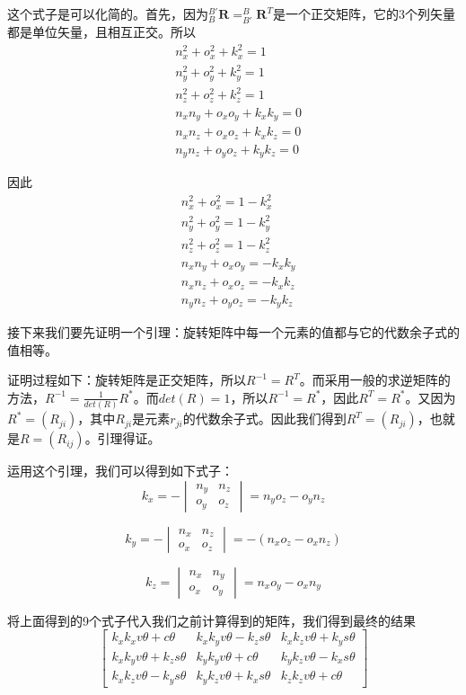 \documentclass{homework}
\begin{document}
\begin{sol}
  这个式子是可以化简的。首先，因为$ _{B}^{B'}\mathbf{R} = _{B'}^{B}\mathbf{R}^T $是一个正交矩阵，它的3个列矢量都是单位矢量，且相互正交。所以
  \begin{align*}
    & n_x^2 + o_x^2 + k_x^2 = 1 \\
    & n_y^2 + o_y^2 + k_y^2 = 1 \\
    & n_z^2 + o_z^2 + k_z^2 = 1 \\
    & n_x n_y + o_x o_y + k_x k_y = 0 \\
    & n_x n_z + o_x o_z + k_x k_z = 0 \\
    & n_y n_z + o_y o_z + k_y k_z = 0 
  \end{align*}

  因此
  \begin{align*}
    & n_x^2 + o_x^2 = 1 - k_x^2 \\
    & n_y^2 + o_y^2 = 1 - k_y^2 \\
    & n_z^2 + o_z^2 = 1 - k_z^2 \\
    & n_x n_y + o_x o_y = -k_x k_y \\
    & n_x n_z + o_x o_z = -k_x k_z \\
    & n_y n_z + o_y o_z = -k_y k_z 
  \end{align*}

  接下来我们要先证明一个引理：旋转矩阵中每一个元素的值都与它的代数余子式的值相等。

  证明过程如下：旋转矩阵是正交矩阵，所以$ R^{-1} = R^T $。而采用一般的求逆矩阵的方法，$ R^{-1} = \frac{1}{det(R)} R^* $。而$ det(R) = 1 $，所以$ R^{-1} = R^* $，因此$ R^T = R^* $。又因为$ R^* = (R_{ji}) $，其中$ R_{ji} $是元素$ r_{ji} $的代数余子式。因此我们得到$ R^T = (R_{ji}) $，也就是$ R = (R_{ij}) $。引理得证。
  
  运用这个引理，我们可以得到如下式子：
  \[
    k_x = -
    \begin{vmatrix}
      n_y & n_z \\
      o_y & o_z 
    \end{vmatrix}
    = n_y o_z - o_y n_z 
  \]
  
  \[
    k_y = -
    \begin{vmatrix}
      n_x & n_z \\
      o_x & o_z 
    \end{vmatrix}
    = -(n_x o_z - o_x n_z)
  \] 

  \[
    k_z = 
    \begin{vmatrix}
      n_x & n_y \\
      o_x & o_y 
    \end{vmatrix}
    = n_x o_y - o_x n_y
  \]

  将上面得到的9个式子代入我们之前计算得到的矩阵，我们得到最终的结果
  \[ 
    \begin{bmatrix}
      k_x k_x v\theta + c\theta & k_x k_y v\theta - k_zs\theta & k_x k_z v\theta + k_ys\theta \\
      k_x k_y v\theta + k_zs\theta & k_y k_y v\theta + c\theta & k_y k_z v\theta - k_xs\theta \\
      k_x k_z v\theta - k_ys\theta & k_y k_z v\theta + k_xs\theta & k_z k_z v\theta + c\theta
    \end{bmatrix}
  \]
  
\end{sol}
\end{document}
